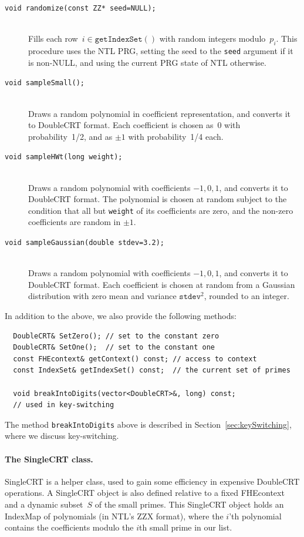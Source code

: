 \documentclass[14pt]{extarticle}
\newcommand{\secref}[1]{Section~\protect\ref{sec:#1}}
\def\IndexMap{\textsf{IndexMap}}
\def\SingleCRT{\textsf{SingleCRT}}
\def\DoubleCRT{\textsf{DoubleCRT}}
\def\FHEcontext{\textsf{FHEcontext}}
\begin{document}
\begin{description}
\item[\texttt{void randomize(const ZZ* seed=NULL);}]\ \\
Fills each row~$i\in\mathtt{getIndexSet()}$ with random integers 
modulo~$p_i$. This procedure uses the NTL PRG, setting the seed
to the \texttt{seed} argument if it is non-NULL, and using the
current PRG state of NTL otherwise.

\item[\texttt{void sampleSmall();}]\ \\
Draws a random polynomial in coefficient representation, and converts
it to {\DoubleCRT} format. Each coefficient is chosen as~0 with
probability~1/2,  and as $\pm 1$ with probability~1/4 each.


\item[\texttt{void sampleHWt(long weight);}]\ \\
Draws a random polynomial with coefficients $-1,0,1$, and converts
it to {\DoubleCRT} format. The polynomial is chosen at random subject
to the condition that all but \texttt{weight} of its coefficients
are zero, and the non-zero coefficients are random in $\pm 1$.

\item[\texttt{void sampleGaussian(double stdev=3.2);}]\ \\
Draws a random polynomial with coefficients $-1,0,1$, and converts
it to {\DoubleCRT} format. Each coefficient is chosen at random from
a Gaussian distribution with zero mean and variance $\mathtt{stdev}^2$,
rounded to an integer.
\end{description}

\noindent
In addition to the above, we also provide the following methods:
\begin{verbatim}
  DoubleCRT& SetZero(); // set to the constant zero
  DoubleCRT& SetOne();  // set to the constant one
  const FHEcontext& getContext() const; // access to context
  const IndexSet& getIndexSet() const;  // the current set of primes

  void breakIntoDigits(vector<DoubleCRT>&, long) const; 
  // used in key-switching
\end{verbatim}
The method \texttt{breakIntoDigits} above is described in
\secref{keySwitching}, where we discuss key-switching.

\paragraph{The {\SingleCRT} class.}\label{sec:SingleCRT}
{\SingleCRT} is a helper class, used to gain some efficiency in
expensive {\DoubleCRT} operations. A {\SingleCRT} object is also defined
relative to a fixed {\FHEcontext} and a dynamic subset~$S$ of the small
primes. This {\SingleCRT} object holds an {\IndexMap} of polynomials
(in NTL's ZZX format), where the $i$'th polynomial contains the
coefficients modulo the $i$th small prime in our list.
\end{document}
